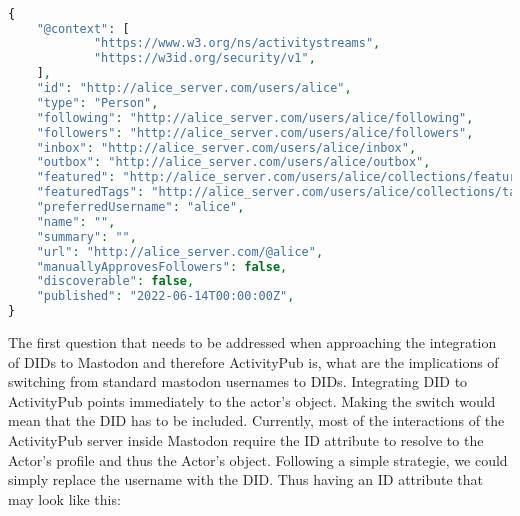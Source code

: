 
\lstset{style=JSONStyle}
\begin{lstlisting}[language=PHP, caption=Alice's actor object, label=fig:alice_actor_object, float=h]

{
	"@context": [
			"https://www.w3.org/ns/activitystreams",
			"https://w3id.org/security/v1",
	],
	"id": "http://alice_server.com/users/alice",
	"type": "Person",
	"following": "http://alice_server.com/users/alice/following",
	"followers": "http://alice_server.com/users/alice/followers",
	"inbox": "http://alice_server.com/users/alice/inbox",
	"outbox": "http://alice_server.com/users/alice/outbox",
	"featured": "http://alice_server.com/users/alice/collections/featured",
	"featuredTags": "http://alice_server.com/users/alice/collections/tags",
	"preferredUsername": "alice",
	"name": "",
	"summary": "",
	"url": "http://alice_server.com/@alice",
	"manuallyApprovesFollowers": false,
	"discoverable": false,
	"published": "2022-06-14T00:00:00Z",
}


\end{lstlisting}

The first question that needs to be addressed when approaching the integration of DIDs to Mastodon and therefore ActivityPub is, what are the implications of switching from standard mastodon usernames to DIDs. Integrating DID to ActivityPub points immediately to the actor's object. Making the switch would mean that the DID has to be included. Currently, most of the interactions of the ActivityPub server inside Mastodon require the ID attribute to resolve to the Actor's profile and thus the Actor's object. Following a simple strategie, we could simply replace the username with the DID. Thus having an ID attribute that may look like this: 



